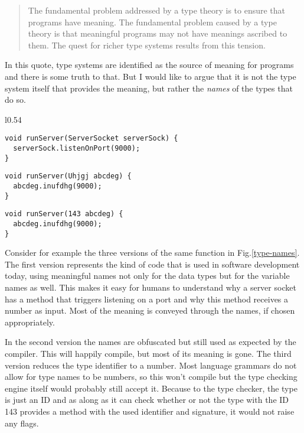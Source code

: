 \begin{quote}
The fundamental problem addressed by a type theory is to ensure
that programs have meaning. The fundamental problem caused by a
type theory is that meaningful programs may not have meanings ascribed
to them. The quest for richer type systems results from this tension.
\end{quote}

In this quote, type systems are identified as the source of
meaning for programs and there is some truth to that. But I
would like to argue that it is not the type system itself that
provides the meaning, but rather the \textit{names} of the types
that do so.
\newpage

\begin{wrapfigure}{l}{0.54\textwidth}
  \begin{lstlisting}
void runServer(ServerSocket serverSock) {
  serverSock.listenOnPort(9000);
}
  \end{lstlisting}


  \begin{lstlisting}
void runServer(Uhjgj abcdeg) {
  abcdeg.inufdhg(9000);
}
  \end{lstlisting}

  \begin{lstlisting}
void runServer(143 abcdeg) {
  abcdeg.inufdhg(9000);
}
  \end{lstlisting}
  \caption{Example showing the importance of \textit{names} for
           human understanding and reasoning about code.}
  \label{type-names}
\end{wrapfigure}

Consider for example the three versions of the same function in
Fig.\ref{type-names}. The first version represents the kind of
code that is used in software development today, using meaningful
names not only for the data types but for the variable names as well.
This makes it easy for humans to understand why a server socket
has a method that triggers listening on a port and why this method
receives a number as input. Most of the meaning is conveyed through
the names, if chosen appropriately.

In the second version the names are obfuscated but still used as
expected by the compiler. This will happily compile, but most of its
meaning is gone. The third version reduces the type identifier to
a number. Most language grammars do not allow for type names to
be numbers, so this won't compile but the type checking engine itself
would probably still accept it. Because to the type checker, the type
is just an ID and as along as it can check whether or not the type
with the ID 143 provides a method with the used identifier and
signature, it would not raise any flags.
\newline

